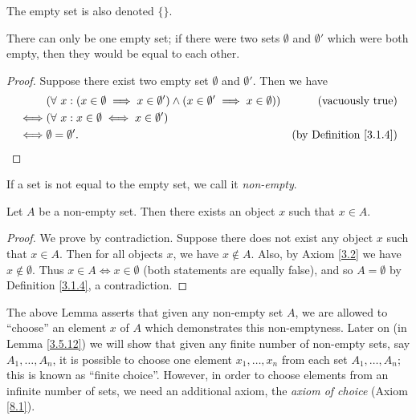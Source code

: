 \begin{note}
    The empty set is also denoted \(\{\}\).
\end{note}

\begin{additional corollary}\label{ac 3.1.2}
There can only be one empty set;
if there were two sets \(\emptyset\) and \(\emptyset'\) which were both empty, then they would be equal to each other.
\end{additional corollary}

\begin{proof}
    Suppose there exist two empty set \(\emptyset\) and \(\emptyset'\).
    Then we have
    \begin{align*}
             & (\forall\ x : (x \in \emptyset \implies x \in \emptyset') \land (x \in \emptyset' \implies x \in \emptyset)) & \text{(vacuously true)}            \\
        \iff & (\forall\ x : x \in \emptyset \iff x \in \emptyset')                                                                                              \\
        \iff & \emptyset = \emptyset'.                                                                                      & \text{(by Definition \ref{3.1.4})}
    \end{align*}
\end{proof}

\begin{note}
    If a set is not equal to the empty set, we call it \emph{non-empty}.
\end{note}

\setcounter{theorem}{5}
\begin{lemma}\label{3.1.6}
    Let \(A\) be a non-empty set.
    Then there exists an object \(x\) such that \(x \in A\).
\end{lemma}

\begin{proof}
    We prove by contradiction.
    Suppose there does not exist any object \(x\) such that \(x \in A\).
    Then for all objects \(x\), we have \(x \notin A\).
    Also, by Axiom \ref{3.2} we have \(x \notin \emptyset\).
    Thus \(x \in A \iff x \in \emptyset\) (both statements are equally false), and so \(A = \emptyset\) by Definition \ref{3.1.4}, a contradiction.
\end{proof}

\begin{remark}\label{3.1.7}
    The above Lemma asserts that given any non-empty set \(A\), we are allowed to ``choose'' an element \(x\) of \(A\) which demonstrates this non-emptyness.
    Later on (in Lemma \ref{3.5.12}) we will show that given any finite number of non-empty sets, say \(A_1, \dots, A_n\), it is possible to choose one element \(x_1, \dots, x_n\) from each set \(A_1, \dots, A_n\);
    this is known as ``finite choice''.
    However, in order to choose elements from an infinite number of sets, we need an additional axiom, the \emph{axiom of choice} (Axiom \ref{8.1}).
\end{remark}

